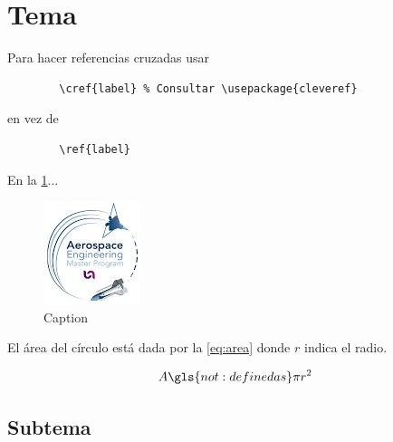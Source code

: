 \label{chap:theory}

\lipsum[17]

\section{Tema}\label{sec:theory bci}

    \glsaddall

    Para hacer referencias cruzadas usar
    \begin{lstlisting}
        \cref{label} % Consultar \usepackage{cleveref}
    \end{lstlisting}
    en vez de
    \begin{lstlisting}
        \ref{label}
    \end{lstlisting}

    En la \cref{fig:enter-label}... 
    
    \begin{figure}[htb]
        \centering
        \includegraphics[scale=1.2]{graphics/titlepage/mia.jpg}
        \caption{Caption}
        \label{fig:enter-label}
    \end{figure}

    El área del círculo está dada por la \cref{eq:area} donde $r$ indica el radio.
    
    \begin{equation}
        \label{eq:area}
        A \gls{not:defined as} \pi r^2
    \end{equation}

\subsection{Subtema}